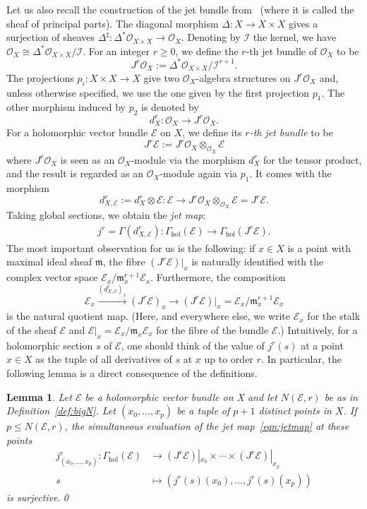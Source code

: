 \documentclass[a4paper]{amsart}
\newcommand{\cE}{\mathcal E}
\newcommand{\cO}{\mathcal O}
\newcommand{\cI}{\mathcal I}
\newcommand{\fm}{\mathfrak m}
\newcommand{\lra}{\longrightarrow}
\theoremstyle{plain}
\newtheorem{lemma}[theorem]{Lemma}
\theoremstyle{definition}
\newcommand{\Gammahol}{\Gamma_{\mathrm{hol}}}
\begin{document}
Let us also recall the construction of the jet bundle from~\cite[IV.16.7]{grothendieck_elements_1967} (where it is called the sheaf of principal parts). The diagonal morphism $\Delta \colon X \to X \times X$ gives a surjection of sheaves $\Delta^\sharp \colon \Delta^*\cO_{X \times X} \to \cO_X$. Denoting by $\cI$ the kernel, we have $\cO_X \cong \Delta^* \cO_{X \times X}/\cI$. For an integer $r \geq 0$, we define the $r$-th jet bundle of $\cO_X$ to be
\[
    J^r\cO_X := \Delta^* \cO_{X \times X} / \cI^{r+1}.
\]
The projections $p_i \colon X \times X \to X$ give two $\cO_X$-algebra structures on $J^r\cO_X$ and, unless otherwise specified, we use the one given by the first projection $p_1$. The other morphism induced by $p_2$ is denoted by
\[
    d^r_X \colon \cO_X \lra J^r\cO_X.
\]
For a holomorphic vector bundle $\cE$ on $X$, we define its \emph{$r$-th jet bundle} to be
\begin{equation}
    J^r \cE := J^r\cO_X \otimes_{\cO_X} \cE
\end{equation}
where $J^r\cO_X$ is seen as an $\cO_X$-module via the morphism $d^r_X$ for the tensor product, and the result is regarded as an $\cO_X$-module again via $p_1$. It comes with the morphism
\[
    d^r_{X,\cE} := d^r_X \otimes \cE \colon \cE \lra J^r\cO_X \otimes_{\cO_X} \cE = J^r\cE.
\]
Taking global sections, we obtain the \emph{jet map}:
\begin{align}\label{eqn:jetmap}
    j^r = \Gamma(d^r_{X,\cE}) \colon \Gammahol(\cE) \lra \Gammahol(J^r\cE).
\end{align}
The most important observation for us is the following: if $x \in X$ is a point with maximal ideal sheaf $\fm$, the fibre $(J^r\cE)|_x$ is naturally identified with the complex vector space $\cE_x / \fm_x^{r+1} \cE_x$. Furthermore, the composition
\[
    \cE_x \overset{(d^r_{X,\cE})_x}{\lra} (J^r\cE)_x \lra (J^r\cE)|_x = \cE_x / \fm_x^{r+1} \cE_x
\]
is the natural quotient map. (Here, and everywhere else, we write $\cE_x$ for the stalk of the sheaf $\cE$ and $\cE|_x = \cE_x / \fm_x \cE_x$ for the fibre of the bundle $\cE$.) Intuitively, for a holomorphic section $s$ of $\cE$, one should think of the value of $j^r(s)$ at a point $x\in X$ as the tuple of all derivatives of $s$ at $x$ up to order $r$. In particular, the following lemma is a direct consequence of the definitions.
\begin{lemma}\label{lemma:multijet}
Let $\cE$ be a holomorphic vector bundle on X and let $N(\cE,r)$ be as in Definition~\ref{def:bigN}. Let $(x_0, \ldots, x_p)$ be a tuple of $p+1$ distinct points in $X$. If $p \leq N(\cE,r)$, the simultaneous evaluation of the jet map~\eqref{eqn:jetmap} at these points
\begin{align*}
    j^r_{(x_0,\ldots,x_p)} \colon \Gammahol(\cE) &\lra (J^r\cE)|_{x_0} \times \cdots \times (J^r\cE)|_{x_p} \\
                                    s &\longmapsto \left(j^r(s)(x_0), \ldots, j^r(s)(x_p)\right)
\end{align*}
is surjective.\qed
\end{lemma}
\end{document}
